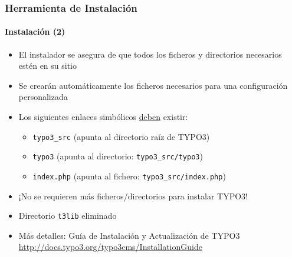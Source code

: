 
\begin{frame}[fragile]

	\frametitle{Herramienta de Instalación}
	\framesubtitle{Instalación (2)}

	\begin{itemize}
		\item El instalador se asegura de que todos los ficheros y directorios necesarios estén en su sitio
		\item Se crearán automáticamente los ficheros necesarios para una configuración personalizada
		\item Los siguientes enlaces simbólicos \underline{deben} existir:

		\begin{itemize}
			\item \texttt{typo3\_src}	\tabto{2cm} (apunta al directorio raíz de TYPO3)
			\item \texttt{typo3}		\tabto{2cm} (apunta al directorio: \texttt{typo3\_src/typo3})
			\item \texttt{index.php}	\tabto{2cm} (apunta al fichero: \texttt{typo3\_src/index.php})
		\end{itemize}

		\item ¡No se requieren más ficheros/directorios para instalar TYPO3!
		\item Directorio \texttt{t3lib} eliminado
		\item Más detalles: Guía de Instalación y Actualización de TYPO3\newline
			\url{http://docs.typo3.org/typo3cms/InstallationGuide}

	\end{itemize}

\end{frame}



